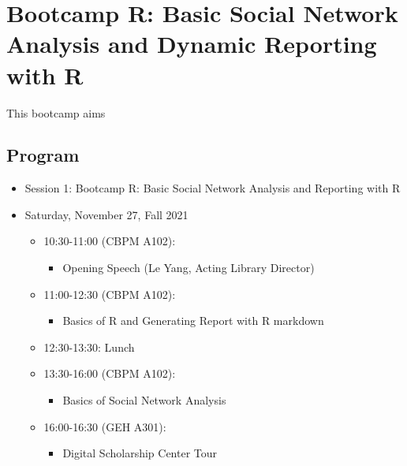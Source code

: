 \documentclass[
]{book}
\providecommand{\tightlist}{%
  \setlength{\itemsep}{0pt}\setlength{\parskip}{0pt}}
\begin{document}
\hypertarget{bootcamp-r-basic-social-network-analysis-and-dynamic-reporting-with-r}{%
\chapter{Bootcamp R: Basic Social Network Analysis and Dynamic Reporting with R}\label{bootcamp-r-basic-social-network-analysis-and-dynamic-reporting-with-r}}

This bootcamp aims

\hypertarget{program}{%
\section{Program}\label{program}}

\begin{itemize}
\tightlist
\item
  Session 1: Bootcamp R: Basic Social Network Analysis and Reporting with R
\item
  Saturday, November 27, Fall 2021

  \begin{itemize}
  \tightlist
  \item
    10:30-11:00 (CBPM A102):

    \begin{itemize}
    \tightlist
    \item
      Opening Speech (Le Yang, Acting Library Director)
    \end{itemize}
  \item
    11:00-12:30 (CBPM A102):

    \begin{itemize}
    \tightlist
    \item
      Basics of R and Generating Report with R markdown
    \end{itemize}
  \item
    12:30-13:30: Lunch
  \item
    13:30-16:00 (CBPM A102):

    \begin{itemize}
    \tightlist
    \item
      Basics of Social Network Analysis
    \end{itemize}
  \item
    16:00-16:30 (GEH A301):

    \begin{itemize}
    \tightlist
    \item
      Digital Scholarship Center Tour
    \end{itemize}
  \end{itemize}
\end{itemize}
\end{document}
